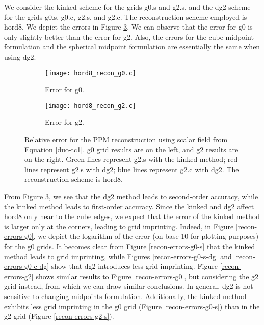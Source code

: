 We consider the kinked scheme for the grids g0.s and g2.s, and the dg2 scheme for the grids g0.s, g0.c, g2.s, and g2.c.
The reconstruction scheme employed is hord8. We depict the errors in Figure \ref{cs-recon-error}.
We can observe that the error for g0 is only slightly better than the error for g2.
Also, the errors for the cube midpoint formulation and the spherical midpoint formulation are essentially the same when using dg2.
\begin{figure}[!htb]
	\centering
	\begin{subfigure}{0.45\textwidth}
		\centering
		\texttt{[image: hord8\_recon\_g0.c]}
		\caption{Error for g0.\label{cs-recon-g0}}
	\end{subfigure}
	\begin{subfigure}{0.45\textwidth}
		\centering
		\texttt{[image: hord8\_recon\_g2.c]}
		\caption{Error for g2.\label{cs-recon-g2}}
	\end{subfigure}
	\caption{Relative error for the PPM reconstruction using scalar field from Equation \eqref{duo-tc1}.
	g0 grid results are on the left, and g2 results are on the right.
	Green lines represent g2.s with the kinked method;
	red lines represent g2.s with dg2;
	blue lines represent g2.c with dg2.
	The reconstruction scheme is hord8.\label{cs-recon-error}}
\end{figure}

From Figure \ref{cs-recon-error}, we see that the dg2 method leads to second-order accuracy, while the kinked method leads to first-order accuracy.
Since the kinked and dg2 affect hord8 only near to the cube edges, we expect that the error of the kinked  method is larger only at the corners, leading to grid imprinting.
Indeed, in Figure \ref{recon-errors-g0}, we depict the logarithm of the error (on base 10 for plotting purposes) for the g0 grids.
It becomes clear from Figure \ref{recon-errors-g0-s} that the kinked method leads to grid imprinting,
while Figures \ref{recon-errors-g0-s-dg} and \ref{recon-errors-g0-c-dg} show that dg2 introduces less grid imprinting.
Figure \ref{recon-errors-g2} shows similar results to Figure \ref{recon-errors-g0}, but considering the g2 grid instead, from which we can draw similar conclusions.
In general, dg2 is not sensitive to changing midpoints formulation.
Additionally, the kinked method exhibits less grid imprinting in the g0 grid (Figure \ref{recon-errors-g0-s}) than in the g2 grid (Figure \ref{recon-errors-g2-s}).

